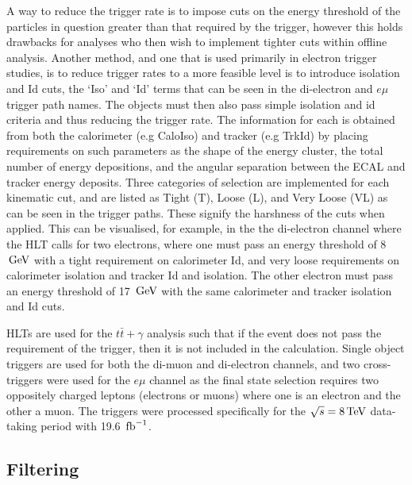 A way to reduce the trigger rate is to impose cuts on the energy threshold of the particles in question greater than that required by the trigger, however this holds drawbacks for analyses who then wish to implement tighter cuts within offline analysis. Another method, and one that is used primarily in electron trigger studies, is to reduce trigger rates to a more feasible level is to introduce isolation and Id cuts, the `Iso' and `Id' terms that can be seen in the di-electron and $e\mu$ trigger path names. The objects must then also pass simple isolation and id criteria and thus reducing the trigger rate. The information for each is obtained from both the calorimeter (e.g CaloIso) and tracker (e.g TrkId) by placing requirements on such parameters as the shape of the energy cluster, the total number of energy depositions, and the angular separation between the ECAL and tracker energy deposits. Three categories of selection are implemented for each kinematic cut, and are listed as Tight (T), Loose (L), and Very Loose (VL) as can be seen in the trigger paths. These signify the harshness of the cuts when applied. This can be visualised, for example, in the the di-electron channel where the HLT calls for two electrons, where one must pass an energy threshold of 8 $\,\text{Ge\hspace{-.08em}V}$ with a tight requirement on calorimeter Id, and very loose requirements on calorimeter isolation and tracker Id and isolation. The other electron must pass an energy threshold of 17 $\,\text{Ge\hspace{-.08em}V}$ with the same calorimeter and tracker isolation and Id cuts.

HLTs are used for the $t\bar{t}+\gamma$ analysis such that if the event does not pass the requirement of the trigger, then it is not included in the calculation. Single object triggers are used for both the di-muon and di-electron channels, and two cross-triggers were used for the $e\mu$ channel as the final state selection requires two oppositely charged leptons (electrons or muons) where one is an electron and the other a muon. The triggers were processed specifically for the $\sqrt{s}=8 \,\text{Te\hspace{-.08em}V}$ data-taking period with 19.6 $\mbox{\ensuremath{\,\text{fb}^\text{$-$1}}}$.

\subsection{Filtering}

